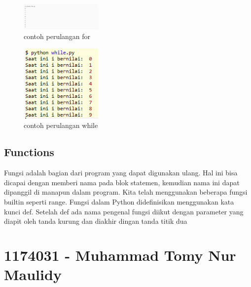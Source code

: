 	\begin{figure}[H]
		\centering
		\includegraphics[width=4cm]{figures/kelompok1/1/damara/o_for.PNG}
		\caption{contoh perulangan for}
	\end{figure}

	\begin{figure}[H]
		\centering
		\includegraphics[width=4cm]{figures/kelompok1/1/damara/o_while.PNG}
		\caption{contoh perulangan while}
	\end{figure}

\subsection{Functions}
Fungsi adalah bagian dari program yang dapat digunakan ulang. Hal ini bisa dicapai dengan memberi nama pada blok statemen, kemudian nama ini dapat dipanggil di manapun dalam program. Kita telah menggunakan beberapa fungsi builtin seperti range.
Fungsi dalam Python didefinisikan menggunakan kata kunci def. Setelah def ada nama pengenal fungsi diikut dengan parameter yang diapit oleh tanda kurung dan diakhir dingan tanda titik dua 
\hfill\break

\hfill\break

\section{1174031 - Muhammad Tomy Nur Maulidy}
